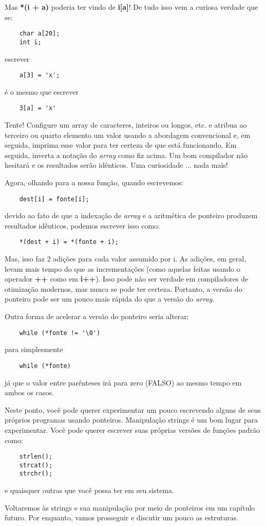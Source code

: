 Mas \textbf{*(i + a)} poderia ter vindo de \textbf{i[a]}! De tudo isso vem a curiosa verdade que se:
\begin{lstlisting}
	char a[20];
	int i;
\end{lstlisting}
escrever
\begin{lstlisting}
	a[3] = 'x';
\end{lstlisting}
é o mesmo que escrever
\begin{lstlisting}
	3[a] = 'x'
\end{lstlisting}

Tente! Configure um array de caracteres, inteiros ou longos, etc. e atribua ao terceiro ou quarto elemento um valor usando a abordagem convencional e, em seguida, imprima esse valor para ter certeza de que está funcionando. Em seguida, inverta a notação do \textit{array} como fiz acima. Um bom compilador não hesitará e os resultados serão idênticos. Uma curiosidade ... nada mais!

Agora, olhando para a nossa função, quando escrevemos:
\begin{lstlisting}
	dest[i] = fonte[i];
\end{lstlisting}
devido ao fato de que a indexação de \textit{array} e a aritmética de ponteiro produzem resultados idênticos, podemos escrever isso como:
\begin{lstlisting}
	*(dest + i) = *(fonte + i);
\end{lstlisting}

Mas, isso faz 2 adições para cada valor assumido por i. As adições, em geral, levam mais tempo do que as incrementações (como aquelas feitas usando o operador \textbf{++} como em \textbf{i++}). Isso pode não ser verdade em compiladores de otimização modernos, mas nunca se pode ter certeza. Portanto, a versão do ponteiro pode ser um pouco mais rápida do que a versão do \textit{array}.

Outra forma de acelerar a versão do ponteiro seria alterar:
\begin{lstlisting}
	while (*fonte != '\0')
\end{lstlisting}
para simplesmente
\begin{lstlisting}
	while (*fonte)
\end{lstlisting}
já que o valor entre parênteses irá para zero (FALSO) ao mesmo tempo em ambos os casos.

Neste ponto, você pode querer experimentar um pouco escrevendo alguns de seus próprios programas usando ponteiros. Manipulação strings é um bom lugar para experimentar. Você pode querer escrever suas próprias versões de funções padrão como:
\begin{lstlisting}
	strlen();
	strcat();
	strchr();
\end{lstlisting}
e quaisquer outras que você possa ter em seu sistema.

Voltaremos às strings e sua manipulação por meio de ponteiros em um capítulo futuro. Por enquanto, vamos prosseguir e discutir um pouco as estruturas.

